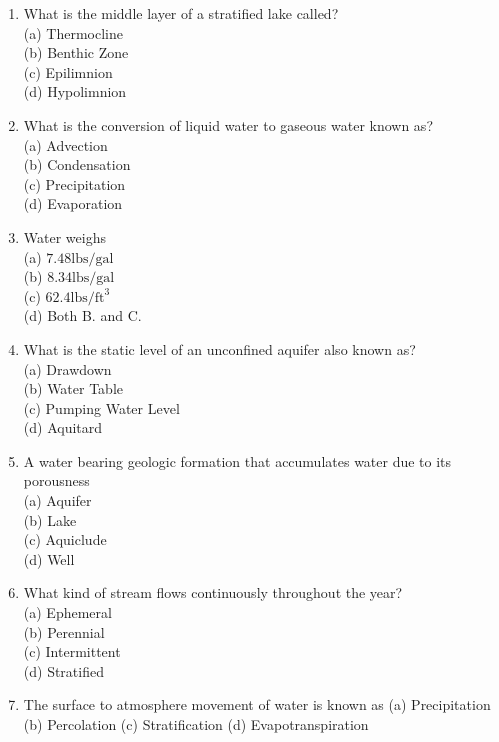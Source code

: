 \documentclass[10pt]{article}
\begin{document}
\begin{enumerate}
  \item What is the middle layer of a stratified lake called?\\
(a) Thermocline\\
(b) Benthic Zone\\
(c) Epilimnion\\
(d) Hypolimnion\\

  \item What is the conversion of liquid water to gaseous water known as?\\
(a) Advection\\
(b) Condensation\\
(c) Precipitation\\
(d) Evaporation\\

  \item Water weighs\\
(a) $7.48 \mathrm{lbs} / \mathrm{gal}$\\
(b) $8.34 \mathrm{lbs} / \mathrm{gal}$\\
(c) $62.4 \mathrm{lbs} / \mathrm{ft}^{3}$\\
(d) Both B. and C.\\

  \item What is the static level of an unconfined aquifer also known as?\\
(a) Drawdown\\
(b) Water Table\\
(c) Pumping Water Level\\
(d) Aquitard\\

  \item A water bearing geologic formation that accumulates water due to its porousness\\
(a) Aquifer\\
(b) Lake\\
(c) Aquiclude\\
(d) Well\\

  \item What kind of stream flows continuously throughout the year?\\
(a) Ephemeral\\
(b) Perennial\\
(c) Intermittent\\
(d) Stratified\\

  \item The surface to atmosphere movement of water is known as
(a) Precipitation
(b) Percolation
(c) Stratification
(d) Evapotranspiration


\end{enumerate}
\end{document}

